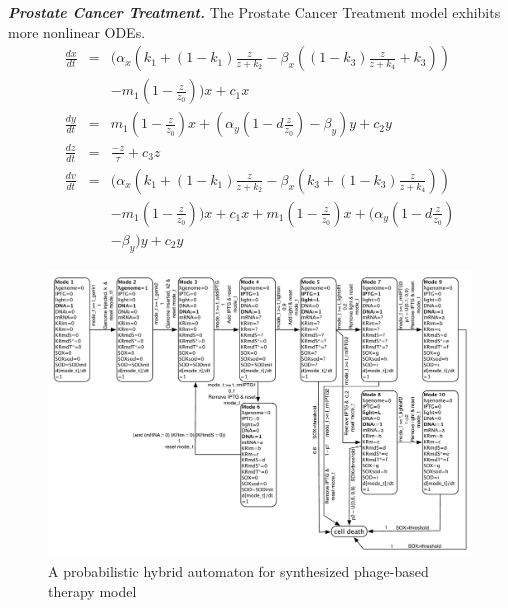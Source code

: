 \textbf{\textit{Prostate Cancer Treatment.}} The Prostate Cancer Treatment model exhibits more nonlinear ODEs. 
\begin{eqnarray*}
\frac{dx}{dt} &=& (\alpha_x
(k_1+(1-k_1)\frac{z}{z+k_2}-\beta_x( (1-k_3)\frac{z}{z+k_4}+k_3))\\
& &- m_1(1-\frac{z}{z_0}))x + c_1 x\\
\frac{dy}{dt} &=& m_1(1-\frac{z}{z_0})x+(\alpha_y (1- d\frac{z}{z_0}) - \beta_y)y+c_2y\\
\frac{dz}{dt} &=& \frac{-z}{\tau} + c_3z\\
\frac{dv}{dt} &=& (\alpha_x
(k_1+(1-k_1)\frac{z}{z+k_2}-\beta_x(k_3+(1-k_3)\frac{z}{z+k_4}))\\
& &- m_1(1-\frac{z}{z_0}))x + c_1 x + m_1(1-\frac{z}{z_0})x+(\alpha_y (1- d\frac{z}{z_0})\\
& &- \beta_y)y+c_2y
\end{eqnarray*}

\begin{figure}[ht]
\centering
\includegraphics[width=\linewidth]{killerredmodel}
\caption{A probabilistic hybrid automaton for synthesized phage-based therapy model}
\label{fig:killerred}
\end{figure}

